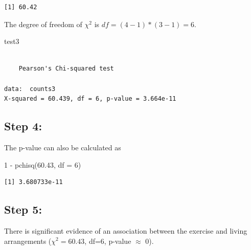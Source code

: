 \documentclass[
]{book}
\newenvironment{Shaded}{\begin{snugshade}}{\end{snugshade}}
\newcommand{\AttributeTok}[1]{\textcolor[rgb]{0.77,0.63,0.00}{#1}}
\newcommand{\DecValTok}[1]{\textcolor[rgb]{0.00,0.00,0.81}{#1}}
\newcommand{\FloatTok}[1]{\textcolor[rgb]{0.00,0.00,0.81}{#1}}
\newcommand{\FunctionTok}[1]{\textcolor[rgb]{0.00,0.00,0.00}{#1}}
\newcommand{\NormalTok}[1]{#1}
\newcommand{\SpecialCharTok}[1]{\textcolor[rgb]{0.00,0.00,0.00}{#1}}
\begin{document}
\begin{verbatim}
[1] 60.42
\end{verbatim}

The degree of freedom of \(\chi^2\) is \(df = (4-1)*(3-1) = 6\).

\begin{Shaded}
\begin{Highlighting}[]
\NormalTok{test3}
\end{Highlighting}
\end{Shaded}

\begin{verbatim}

    Pearson's Chi-squared test

data:  counts3
X-squared = 60.439, df = 6, p-value = 3.664e-11
\end{verbatim}

\hypertarget{step-4}{%
\subsection{Step 4:}\label{step-4}}

The p-value can also be calculated as

\begin{Shaded}
\begin{Highlighting}[]
\DecValTok{1} \SpecialCharTok{{-}} \FunctionTok{pchisq}\NormalTok{(}\FloatTok{60.43}\NormalTok{, }\AttributeTok{df =} \DecValTok{6}\NormalTok{)}
\end{Highlighting}
\end{Shaded}

\begin{verbatim}
[1] 3.680733e-11
\end{verbatim}

\hypertarget{step-5}{%
\subsection{Step 5:}\label{step-5}}

There is significant evidence of an association between the exercise and living arrangements (\(\chi^2 = 60.43\), df=6, p-value \(\approx\) 0).

  
\end{document}
